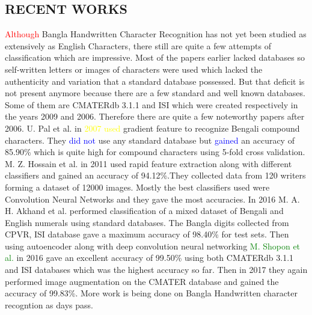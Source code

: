 \documentclass[conference]{IEEEtran}
\begin{document}
\subsection{RECENT WORKS}
\textcolor{red}{Although} Bangla Handwritten Character Recognition has not yet been studied as extensively as English Characters, there still are quite a few attempts of classification which are impressive. Most of the papers earlier lacked databases so self-written letters or images of characters were used which lacked the authenticity and variation that a standard database possessed. But that deficit is not present anymore because there are a few standard and well known databases. Some of them are CMATERdb 3.1.1 \cite{cmater} and ISI \cite{isi} which were created respectively in the years 2009 and 2006. Therefore there are quite a few noteworthy papers after 2006. U. Pal et al. in \textcolor{yellow}{2007 \cite{gradientfeature} used} gradient feature to recognize Bengali compound characters. They \textcolor{blue}{did not} use any standard database but \textcolor{blue}{gained} an accuracy of 85.90\% which is quite high for compound characters using 5-fold cross validation. M. Z. Hossain et al. in 2011 \cite{rapidfeature} used rapid feature extraction along with different classifiers and gained an accuracy of 94.12\%.They collected data from 120 writers forming a dataset of 12000 images. Mostly the best classifiers used were Convolution Neural Networks and they gave the most accuracies. In 2016 M. A. H. Akhand et al. \cite{convolution} performed classification of a mixed dataset of Bengali and English numerals using standard databases. The Bangla digits collected from CPVR, ISI \cite{isi} database gave a maximum accuracy of 98.40\% for test sets. Then using autoencoder along with deep convolution neural networking \textcolor{green}{M. Shopon et al.} in 2016 \cite{autoencoder} gave an excellent accuracy of 99.50\% using both CMATERdb 3.1.1 \cite{cmater} and ISI \cite{isi} databases which was the highest accuracy so far. Then in 2017 \cite{blocky} they again performed image augmentation on the CMATER database and gained the accuracy of 99.83\%. More work is being done on Bangla Handwritten character recogntion as days pass.

\end{document}
